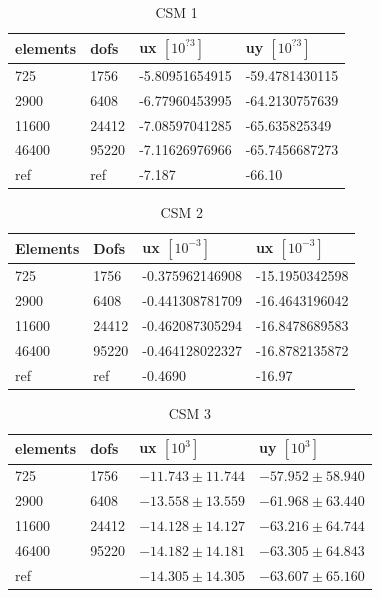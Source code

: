 \begin{table}[h!]
\centering
\caption{CSM 1}
\label{my-label}
\begin{tabular}{|l|l|l|l|}
\hline
elements & dofs & ux $[10^{?3}]$ & uy $[10^{?3}]$ \\ \hline
725 & 1756 & -5.80951654915 & -59.4781430115 \\ \hline
2900 & 6408 & -6.77960453995 & -64.2130757639 \\ \hline
11600 & 24412 & -7.08597041285 & -65.635825349 \\ \hline
46400 & 95220 & -7.11626976966 & -65.7456687273 \\ \hline
ref & ref & -7.187 & -66.10 \\ \hline
\end{tabular}
\end{table}

\begin{table}[h!]
\centering
\caption{CSM 2}
\label{my-label}
\begin{tabular}{@{}|l|l|l|l|@{}}
\hline
Elements & Dofs & ux $[10^{-3}] $& ux $[10^{-3}] $\\ \hline
725 &  1756 & -0.375962146908 & -15.1950342598 \\ \hline
2900 & 6408 & -0.441308781709 & -16.4643196042\\ \hline
11600 & 24412 & -0.462087305294 & -16.8478689583 \\ \hline
46400 & 95220 & -0.464128022327 & -16.8782135872\\ \hline
ref & ref & -0.4690 & -16.97 \\ \hline
\end{tabular}
\end{table}

\begin{table}[h!]
\centering
\caption{CSM 3}
\label{my-label}
\begin{tabular}{|l|l|l|l|}
\hline
elements & dofs & ux $[10^3]$ & uy $[10^3]$ \\ \hline
725 & 1756 & $-11.743 \pm 11.744$ & $-57.952 \pm 58.940$ \\ \hline
2900 & 6408 & $-13.558 \pm 13.559$ & $ -61.968 \pm  63.440 $ \\ \hline
11600 & 24412 & $ -14.128 \pm 14.127$ & $-63.216 \pm 64.744 $ \\ \hline
46400 & 95220 & $ -14.182 \pm 14.181 $ & $ -63.305 \pm 64.843 $ \\ \hline
ref &  & $-14.305 \pm 14.305 $ & $-63.607 \pm 65.160 $ \\ \hline
\end{tabular}
\end{table}

